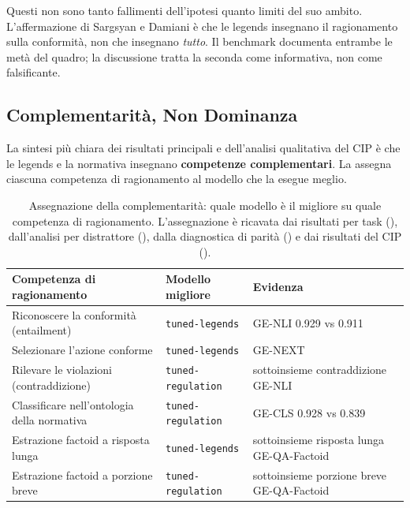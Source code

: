 \documentclass[pdflatex, sn-apa]{sn-jnl}%
\theoremstyle{thmstyleone}%
\theoremstyle{thmstyletwo}%
\theoremstyle{thmstylethree}%
\newcommand{\modellegends}{\texttt{tuned-legends}}
\newcommand{\modelreg}{\texttt{tuned-regulation}}
\begin{document}
Questi non sono tanto fallimenti dell'ipotesi quanto limiti del suo ambito.
L'affermazione di Sargsyan e Damiani è che le legends insegnano il ragionamento
sulla conformità, non che insegnano \emph{tutto}. Il benchmark documenta entrambe
le metà del quadro; la discussione tratta la seconda come informativa, non come
falsificante.

\subsection{Complementarità, Non Dominanza}
\label{sec:disc:complementarity}

La sintesi più chiara dei risultati principali e dell'analisi qualitativa del CIP è
che le legends e la normativa insegnano \textbf{competenze complementari}. La
 assegna ciascuna competenza di ragionamento al modello
che la esegue meglio.

\begin{table}[h]
\centering
\caption{Assegnazione della complementarità: quale modello è il migliore su quale
competenza di ragionamento. L'assegnazione è ricavata dai risultati per task
(), dall'analisi per distrattore (), dalla
diagnostica di parità () e dai risultati del CIP
().}
\label{tab:complementarity}
\small
\begin{tabular}{@{}lll@{}}
\toprule
Competenza di ragionamento                    & Modello migliore   & Evidenza \\
\midrule
Riconoscere la conformità (entailment)        & \modellegends      & GE-NLI
0.929 vs 0.911 \\
Selezionare l'azione conforme                 & \modellegends      & GE-NEXT \\
Rilevare le violazioni (contraddizione)       & \modelreg          & sottoinsieme
contraddizione GE-NLI \\
Classificare nell'ontologia della normativa   & \modelreg          & GE-CLS
0.928 vs 0.839 \\
Estrazione factoid a risposta lunga           & \modellegends      &
sottoinsieme risposta lunga GE-QA-Factoid \\
Estrazione factoid a porzione breve           & \modelreg          &
sottoinsieme porzione breve GE-QA-Factoid \\
\bottomrule
\end{tabular}
\end{table}
\end{document}
